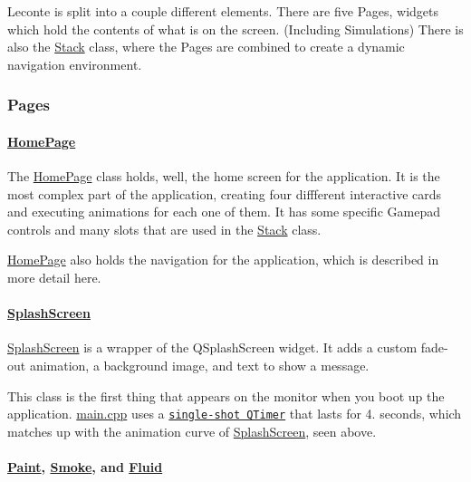 Leconte is split into a couple different elements. There are five Pages, widgets which hold the contents of what is on the screen. (Including Simulations) There is also the \mbox{\hyperlink{classStack}{Stack}} class, where the Pages are combined to create a dynamic navigation environment.

\subsubsection*{Pages}

\paragraph*{\mbox{\hyperlink{classHomePage}{Home\+Page}}}

The \mbox{\hyperlink{classHomePage}{Home\+Page}} class holds, well, the home screen for the application. It is the most complex part of the application, creating four diffferent interactive cards and executing animations for each one of them. It has some specific Gamepad controls and many slots that are used in the \mbox{\hyperlink{classStack}{Stack}} class.

\mbox{\hyperlink{classHomePage}{Home\+Page}} also holds the navigation for the application, which is described in more detail here.

\paragraph*{\mbox{\hyperlink{classSplashScreen}{Splash\+Screen}}}

\mbox{\hyperlink{classSplashScreen}{Splash\+Screen}} is a wrapper of the Q\+Splash\+Screen widget. It adds a custom fade-\/out animation, a background image, and text to show a message.

This class is the first thing that appears on the monitor when you boot up the application. {\ttfamily \mbox{\hyperlink{main_8cpp}{main.\+cpp}}} uses a \href{https://doc.qt.io/qt-5/qtimer.html\#singleShot}{\texttt{ {\ttfamily single-\/shot Q\+Timer}}} that lasts for 4. seconds, which matches up with the animation curve of \mbox{\hyperlink{classSplashScreen}{Splash\+Screen}}, seen above.

\paragraph*{\mbox{\hyperlink{classPaint}{Paint}}, \mbox{\hyperlink{classSmoke}{Smoke}}, and \mbox{\hyperlink{classFluid}{Fluid}}}

